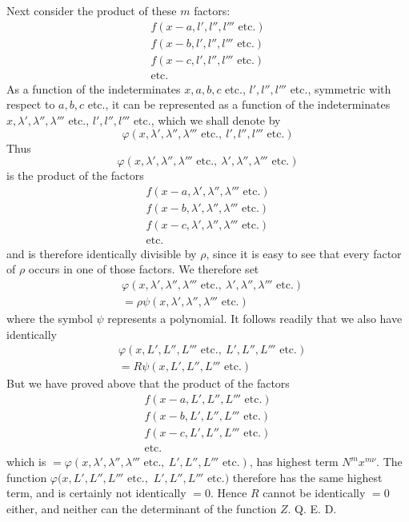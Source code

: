 Next consider the product of these $m$ factors:
\[
\begin{gathered}
f(x-a,l',l'',l'''\text{ etc.})\\
f(x-b,l',l'',l'''\text{ etc.})\\
f(x-c,l',l'',l'''\text{ etc.})\\
\text{etc.}
\end{gathered}
\]
As a function of the indeterminates $x,a,b,c$ etc., $l',l'',l'''$ etc., symmetric with respect to $a,b,c$ etc., it can be represented as a function of the indeterminates $x,\lambda',\lambda'',\lambda'''$ etc., $l',l'',l'''$ etc., which we shall denote by
\[
\varphi(x,\lambda',\lambda'',\lambda'''\text{ etc.},\ l',l'',l'''\text{ etc.})
\]
Thus
\[
\varphi(x,\lambda',\lambda'',\lambda'''\text{ etc.},\ \lambda',\lambda'',\lambda'''\text{ etc.})
\]
is the product of the factors
\[
\begin{gathered}
f(x-a,\lambda',\lambda'',\lambda'''\text{ etc.})\\
f(x-b,\lambda',\lambda'',\lambda'''\text{ etc.})\\
f(x-c,\lambda',\lambda'',\lambda'''\text{ etc.})\\
\text{etc.}
\end{gathered}
\]
and is therefore identically divisible by $\rho$, since it is easy to see that every factor of $\rho$ occurs in one of those factors. We therefore set
\[
\begin{aligned}
&\varphi(x,\lambda',\lambda'',\lambda'''\text{ etc.},\ \lambda',\lambda'',\lambda'''\text{ etc.})\\
&=\rho\psi(x,\lambda',\lambda'',\lambda'''\text{ etc.})
\end{aligned}
\]
where the symbol $\psi$ represents a polynomial. It follows readily that we also have identically
\[
\begin{aligned}
&\varphi(x,\allowbreak L',\allowbreak L'',\allowbreak L'''\text{ etc.},\allowbreak \ L',\allowbreak L'',\allowbreak L'''\text{ etc.})\\
&=R\psi(x,L',L'',L'''\text{ etc.})
\end{aligned}
\]
But we have proved above that the product of the factors
\[
\begin{gathered}
f(x-a,L',L'',L'''\text{ etc.})\\
f(x-b,L',L'',L'''\text{ etc.})\\
f(x-c,L',L'',L'''\text{ etc.})\\
\text{etc.}
\end{gathered}
\]
which is $=\varphi(x,\lambda',\lambda'',\lambda'''\text{ etc.},\ L',L'',L'''\text{ etc.})$, has highest term $N^mx^{m\nu}$. The function $\varphi(x,\allowbreak L',\allowbreak L'',\allowbreak L'''\text{ etc.},\allowbreak $
$L',L'',L'''\text{ etc.})$ therefore has the same highest term, and is certainly not identically $=0$. Hence $R$ cannot be identically $=0$ either, and neither can the determinant of the function $Z$. Q. E. D.

